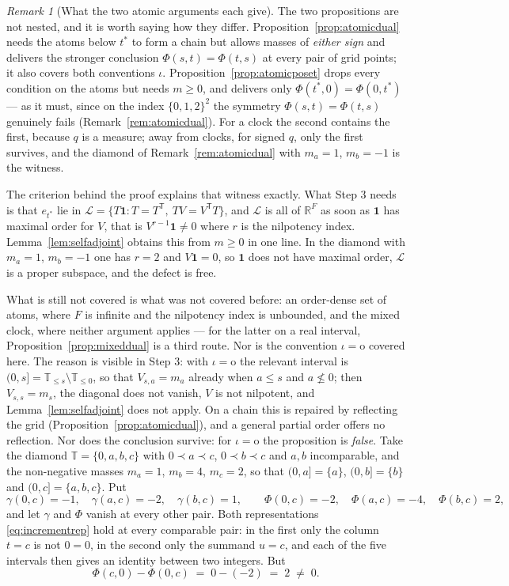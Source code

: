\documentclass[11pt,a4paper]{article}
\theoremstyle{plain}
\theoremstyle{definition}
\theoremstyle{remark}
\newtheorem{remark}[theorem]{Remark}
\newcommand{\R}{\mathbb{R}}
\newcommand{\T}{\mathbb{T}}                     %
\newcommand{\one}{\mathbf{1}}
\begin{document}
\begin{remark}[What the two atomic arguments each give]
  \label{rem:atomicposet}
  The two propositions are not nested, and it is worth saying how they differ.
  Proposition~\ref{prop:atomicdual} needs the atoms below $t^*$ to form a chain
  but allows masses of \emph{either sign} and delivers the stronger conclusion
  $\Phi(s,t) = \Phi(t,s)$ at every pair of grid points; it also covers both
  conventions $\iota$.  Proposition~\ref{prop:atomicposet} drops every condition
  on the atoms but needs $m \geq 0$, and delivers only
  $\Phi(t^*,0) = \Phi(0,t^*)$ --- as it must, since on the index $\{0,1,2\}^2$
  the symmetry $\Phi(s,t) = \Phi(t,s)$ genuinely fails
  (Remark~\ref{rem:atomicdual}).  For a clock the second contains the first,
  because $q$ is a measure; away from clocks, for signed $q$, only the first
  survives, and the diamond of Remark~\ref{rem:atomicdual} with $m_a = 1$,
  $m_b = -1$ is the witness.

  The criterion behind the proof explains that witness exactly.  What
  Step 3 needs is that $e_{t^*}$ lie in
  $\mathcal{L} = \{T\one : T = T^{\mathsf T},\ TV = V^{\mathsf T}T\}$, and
  $\mathcal{L}$ is all of $\R^F$ as soon as $\one$ has maximal order for $V$,
  that is $V^{r-1}\one \neq 0$ where $r$ is the nilpotency index.
  Lemma~\ref{lem:selfadjoint} obtains this from $m \geq 0$ in one line.  In the
  diamond with $m_a = 1$, $m_b = -1$ one has $r = 2$ and $V\one = 0$, so $\one$
  does not have maximal order, $\mathcal{L}$ is a proper subspace, and the defect
  is free.

  What is still not covered is what was not covered before: an order-dense set of
  atoms, where $F$ is infinite and the nilpotency index is unbounded, and the
  mixed clock, where neither argument applies --- for the latter on a real
  interval, Proposition~\ref{prop:mixeddual} is a third route.  Nor is the
  convention
  $\iota = \mathrm{o}$ covered here.  The reason is visible in Step 3: with
  $\iota = \mathrm{o}$ the relevant interval is $(0,s] = \T_{\leq s} \setminus
  \T_{\leq 0}$, so that $V_{s,a} = m_a$ already when $a \leq s$ and
  $a \not\leq 0$; then $V_{s,s} = m_s$, the diagonal does not vanish, $V$ is not
  nilpotent, and Lemma~\ref{lem:selfadjoint}
  does not apply.  On a chain this is repaired by reflecting the grid
  (Proposition~\ref{prop:atomicdual}), and a general partial order offers no
  reflection.  Nor does the conclusion survive: for $\iota = \mathrm{o}$ the
  proposition is \emph{false}.  Take the diamond $\T = \{0,a,b,c\}$ with
  $0 \prec a \prec c$, $0 \prec b \prec c$ and $a,b$ incomparable, and the
  non-negative masses $m_a = 1$, $m_b = 4$, $m_c = 2$, so that
  $(0,a] = \{a\}$, $(0,b] = \{b\}$ and $(0,c] = \{a,b,c\}$.  Put
  \[
    \gamma(0,c) = -1, \quad \gamma(a,c) = -2, \quad \gamma(b,c) = 1,
    \qquad
    \Phi(0,c) = -2, \quad \Phi(a,c) = -4, \quad \Phi(b,c) = 2 ,
  \]
  and let $\gamma$ and $\Phi$ vanish at every other pair.  Both representations
  \eqref{eq:incrementrep} hold at every comparable pair: in the first only the
  column $t = c$ is not $0 = 0$, in the second only the summand $u = c$, and each
  of the five intervals then gives an identity between two integers.  But
  \[
    \Phi(c,0) - \Phi(0,c) \;=\; 0 - (-2) \;=\; 2 \;\neq\; 0 .
  \]


\end{remark}
\end{document}
